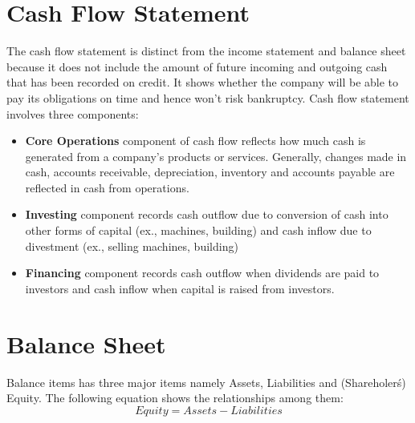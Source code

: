 \section{Cash Flow Statement}
The cash flow statement is distinct from the income statement and balance sheet because it does not include the amount of future incoming and outgoing cash that has been recorded on credit. It shows whether the company will be able to pay its obligations on time and hence won’t risk bankruptcy. Cash flow statement involves three components:

\begin{itemize}
\item \textbf{Core Operations} component of cash flow reflects how much cash is generated from a company's products or services. Generally, changes made in cash, accounts receivable, depreciation, inventory and accounts payable are reflected in cash from operations.
\item \textbf{Investing} component records cash outflow due to conversion of cash into other forms of capital (ex., machines, building) and cash inflow due to divestment (ex., selling machines, building)
\item \textbf{Financing} component records cash outflow when dividends are paid to investors and cash inflow when capital is raised from investors.
\end{itemize}

\section{Balance Sheet}
Balance items has three major items namely Assets, Liabilities and (Shareholer\'s) Equity. The following equation shows the relationships among them: 
$$Equity = Assets - Liabilities$$


